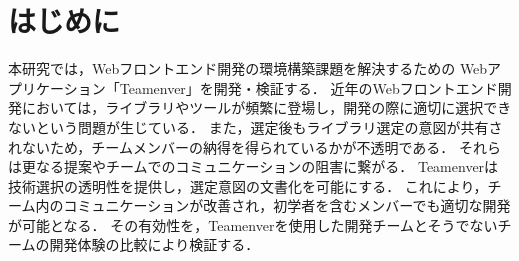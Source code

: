 \documentclass[main]{subfiles}
\begin{document}
\section{はじめに }
本研究では，Webフロントエンド開発の環境構築課題を解決するための
Webアプリケーション「Teamenver」を開発・検証する．
近年のWebフロントエンド開発においては，ライブラリやツールが頻繁に登場し，開発の際に適切に選択できないという問題が生じている\cite{npm}\cite{medium.com}．
また，選定後もライブラリ選定の意図が共有されないため，チームメンバーの納得を得られているかが不透明である．
それらは更なる提案やチームでのコミュニケーションの阻害に繋がる．
Teamenverは技術選択の透明性を提供し，選定意図の文書化を可能にする．
これにより，チーム内のコミュニケーションが改善され，初学者を含むメンバーでも適切な開発が可能となる．
その有効性を，Teamenverを使用した開発チームとそうでないチームの開発体験の比較により検証する．
\end{document}
